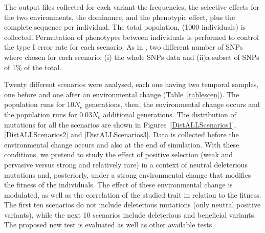 \documentclass[a4paper,11pt]{article}
\begin{document}
The output files collected  for each variant the frequencies, the selective effects for the two environments, the dominance, and the phenotypic effect, plus the complete sequence per individual. The total population, (1000 individuals) is collected. 
Permutation of phenotypes between individuals is performed to control the type I error rate for each scenario. As in \citep{Caballero:2015aa}, two different number of SNPs where chosen for each scenario: (i) the whole SNPs data and (ii)a subset of SNPs of 1\% of the total.

Twenty different scenarios were analysed, each one having two temporal samples, one before and one after an environmental change (Table~\ref{tablescen}). The population runs for $10 N_e$ generations, then, the environmental change occurs and the population runs for $0.03N_e$ additional generations. The distribution of mutations for all the scenarios are shown in Figures~\ref{DistALLScenarios1}, \ref{DistALLScenarios2} and \ref{DistALLScenarios3}. Data is collected before the environmental change occurs and also at the end of simulation. With these conditions, we pretend to study the effect of positive selection (weak and pervasive versus strong and relatively rare) in a context of neutral deleterious mutations and, posteriorly, under a strong environmental change that modifies the fitness of the individuals. The effect of these environmental change is modulated, as well as the correlation of the studied trait in relation to the fitness. The first ten scenarios do not include deleterious mutations (only neutral positive variants), while the next 10 scenarios include deleterious and beneficial variants. The proposed new test is evaluated as well as other available tests  \citep{Beissinger:2018aa,Uricchio:2019aa,Zeng752527}.
 
 
\end{document}
